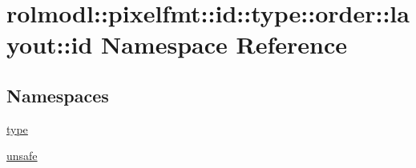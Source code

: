 \hypertarget{namespacerolmodl_1_1pixelfmt_1_1id_1_1type_1_1order_1_1layout_1_1id}{}\section{rolmodl\+::pixelfmt\+::id\+::type\+::order\+::layout\+::id Namespace Reference}
\label{namespacerolmodl_1_1pixelfmt_1_1id_1_1type_1_1order_1_1layout_1_1id}
\subsection*{Namespaces}
\begin{DoxyCompactItemize}
\item 
 \mbox{\hyperlink{namespacerolmodl_1_1pixelfmt_1_1id_1_1type_1_1order_1_1layout_1_1id_1_1type}{type}}
\item 
 \mbox{\hyperlink{namespacerolmodl_1_1pixelfmt_1_1id_1_1type_1_1order_1_1layout_1_1id_1_1unsafe}{unsafe}}
\end{DoxyCompactItemize}
